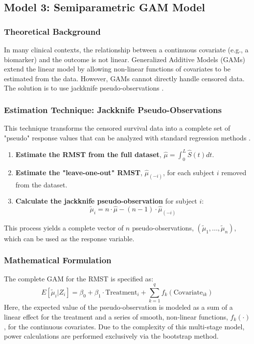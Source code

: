 \documentclass[11pt, a4paper]{article}
\begin{document}
\clearpage

\subsection{Model 3: Semiparametric GAM Model}
\subsubsection{Theoretical Background}
In many clinical contexts, the relationship between a continuous covariate (e.g., a biomarker) and the outcome is not linear. Generalized Additive Models (GAMs) \cite{hastie1986, hastie1990} extend the linear model by allowing non-linear functions of covariates to be estimated from the data. However, GAMs cannot directly handle censored data. The solution is to use jackknife pseudo-observations \cite{andersen2003}.

\subsubsection{Estimation Technique: Jackknife Pseudo-Observations}
This technique transforms the censored survival data into a complete set of "pseudo" response values that can be analyzed with standard regression methods \cite{andersen2010}.
\begin{enumerate}
    \item \textbf{Estimate the RMST from the full dataset}, $\hat{\mu} = \int_0^L \hat{S}(t) dt$.
    \item \textbf{Estimate the "leave-one-out" RMST}, $\hat{\mu}_{(-i)}$, for each subject $i$ removed from the dataset.
    \item \textbf{Calculate the jackknife pseudo-observation} for subject $i$:
    \begin{equation}
    \tilde{\mu}_i = n \cdot \hat{\mu} - (n-1) \cdot \hat{\mu}_{(-i)}
    \end{equation}
\end{enumerate}
This process yields a complete vector of $n$ pseudo-observations, $(\tilde{\mu}_1,..., \tilde{\mu}_n)$, which can be used as the response variable.

\subsubsection{Mathematical Formulation}
The complete GAM for the RMST is specified as:
\begin{equation}
E[\tilde{\mu}_i | Z_i] = \beta_0 + \beta_1 \cdot \text{Treatment}_i + \sum_{k=1}^{q} f_k(\text{Covariate}_{ik})
\end{equation}
Here, the expected value of the pseudo-observation is modeled as a sum of a linear effect for the treatment and a series of smooth, non-linear functions, $f_k(\cdot)$, for the continuous covariates. Due to the complexity of this multi-stage model, power calculations are performed exclusively via the bootstrap method.
\end{document}
